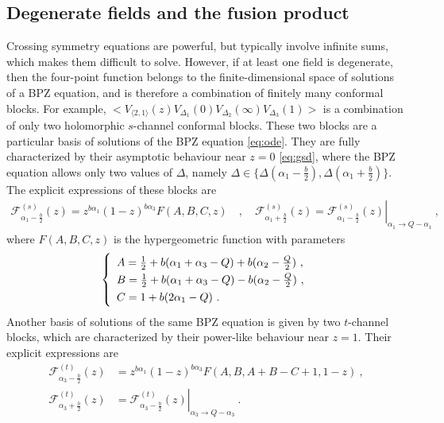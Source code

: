\documentclass[12pt, a4paper]{article}
\theoremstyle{break}
\begin{document}
\subsection{Degenerate fields and the fusion product}\label{sec:dffp}

Crossing symmetry equations are powerful, but typically involve infinite sums, which makes them difficult to solve.
However, if at least one field is degenerate, then the four-point function belongs to the finite-dimensional space of solutions of a BPZ equation, and is therefore a combination of finitely many conformal blocks. 
For example,
$\Big< V_{\langle 2, 1 \rangle}(z) V_{\Delta_1}(0)V_{\Delta_2}(\infty)V_{\Delta_3}(1) \Big>$ is a combination of only two holomorphic $s$-channel conformal blocks.
These two blocks are a particular basis of solutions of the BPZ equation \eqref{eq:ode}.
They are fully characterized by their asymptotic behaviour near $z=0$ \eqref{eq:gsd}, where the BPZ equation allows only two values of $\Delta$, namely $\Delta\in\{\Delta(\alpha_1-\frac{b}{2}),\Delta(\alpha_1+\frac{b}{2})\}$.
The explicit expressions of these blocks are
\begin{align}
\mathcal{F}^{(s)}_{\alpha_1-\frac{b}{2}}(z) = z^{b\alpha_1} (1-z)^{b\alpha_3} F(A,B,C,z)\quad , \quad 
 \mathcal{F}^{(s)}_{\alpha_1+\frac{b}{2}}(z) = \left. \mathcal{F}^{(s)}_{\alpha_1-\frac{b}{2}}(z) \right|_{\alpha_1\to Q-\alpha_1} \ ,
\label{gpm}
\end{align}
where $F(A,B,C,z)$ is the hypergeometric function with parameters
\begin{align}
\renewcommand{\arraystretch}{1.3}
\left\{\begin{array}{l}   A = \frac12 + b(\alpha_1+\alpha_3-Q) + b(\alpha_2-\tfrac{Q}{2}) \ , \\
      B = \frac12 + b(\alpha_1+\alpha_3-Q) - b(\alpha_2-\tfrac{Q}{2}) \ , \\
      C = 1 + b(2\alpha_1-Q) \ .
\end{array}\right. 
\label{abc}
\end{align}
Another basis of solutions of the same BPZ equation is given by two $t$-channel blocks, which are characterized by their power-like behaviour near $z=1$. Their explicit expressions are 
\begin{align}
 \mathcal{F}^{(t)}_{\alpha_3-\frac{b}{2}}(z) &= z^{b\alpha_1} (1-z)^{b\alpha_3} F(A,B,A+B-C+1,1-z)\ ,
 \nonumber \\
 \mathcal{F}^{(t)}_{\alpha_3+\frac{b}{2}}(z) &= \left. \mathcal{F}^{(t)}_{\alpha_3-\frac{b}{2}}(z) \right|_{\alpha_3\to Q-\alpha_3} \ .
\end{align}
\end{document}
